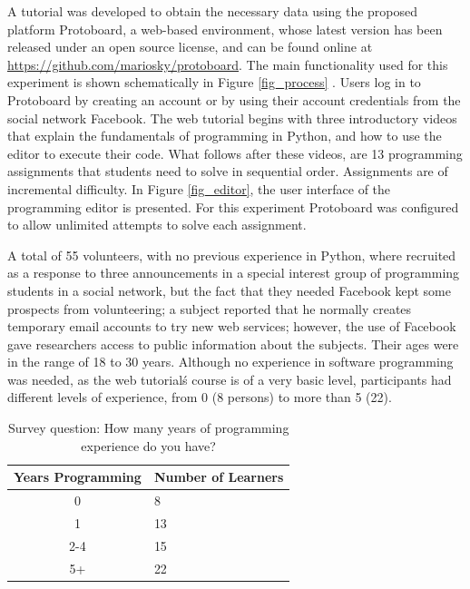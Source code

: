 \documentclass[a4paper,twoside]{article}
\begin{document}
A tutorial was developed to
obtain the necessary data using the proposed platform Protoboard, a web-based environment,
whose latest version has been released under an open source license,
and can be found online at \url{https://github.com/mariosky/protoboard}.
The main functionality  used for this experiment is
shown schematically in Figure \ref{fig_process} . %
Users log in to
Protoboard  by creating an account or by using their account 
credentials from the
social network Facebook. The web tutorial begins with three introductory 
videos that explain
the fundamentals of programming in Python, and how to use the editor to
execute their code. What follows after these videos, are 13 programming
assignments that students need to solve in sequential order. Assignments are of
incremental difficulty.
In Figure \ref{fig_editor},
the user interface of the programming editor is
presented.
For this experiment Protoboard was configured to allow unlimited
attempts to solve each assignment.

A total of 55 volunteers, with no previous experience in Python, where recruited
as a response to three announcements in a special interest group of programming
students in a social network, but the fact that they needed Facebook kept some prospects from
volunteering; a subject reported that he normally creates temporary email
accounts to try new web services; however, the use of Facebook gave researchers access to public
information about the subjects. Their ages were in the range of 18 to
30 years. Although no experience in software programming was needed, as the
web tutorial\'s course is of a very basic level, participants had
different levels of experience, from 0 (8 persons) to more than 5 (22).

\begin{table}[!t]
\centering
\caption{ Survey question: How many years of programming experience do you have? }
\label{tab_results}
    \begin{tabular}{ | c | l | }
    \hline
    Years Programming          & Number of Learners \\
    \hline
   		0   &  8 \\
    \hline
    	1   &  13\\
    \hline
    	2-4  & 15\\
    \hline
    	5+   & 22\\
    \hline
    \end{tabular}

\end{table}
\end{document}
